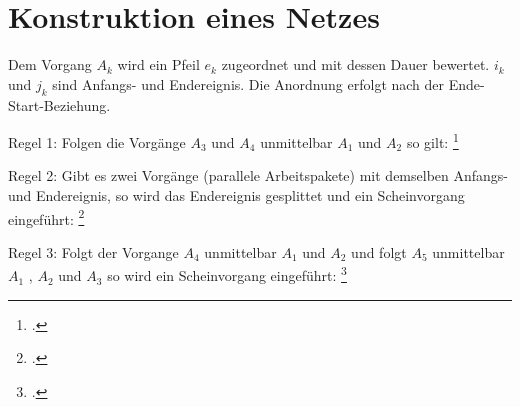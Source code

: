 \documentclass{lehramt-informatik}
\begin{document}
\section{Konstruktion eines Netzes}

Dem Vorgang $A_k$ wird ein Pfeil $e_k$ zugeordnet und mit dessen Dauer
bewertet.
%
$i_k$ und $j_k$ sind Anfangs- und Endereignis.
%
Die Anordnung erfolgt nach der Ende-Start-Beziehung.

\begin{center}
\end{center}

Regel 1: Folgen die Vorgänge $A_3$ und $A_4$ unmittelbar $A_1$ und $A_2$
so gilt:
\footcite[Seite 24]{sosy:fs:3}

\begin{center}
\end{center}

Regel 2: Gibt es zwei Vorgänge (parallele Arbeitspakete) mit demselben
Anfangs- und Endereignis, so wird das Endereignis gesplittet und ein
Scheinvorgang eingeführt:
\footcite[Seite 25]{sosy:fs:3}

\begin{center}
\end{center}

Regel 3: Folgt der Vorgange $A_4$ unmittelbar $A_1$ und $A_2$ und folgt
$A_5$ unmittelbar $A_1$ , $A_2$ und $A_3$ so wird ein Scheinvorgang
eingeführt:
\footcite[Seite 26]{sosy:fs:3}

\begin{center}
\end{center}
\end{document}
